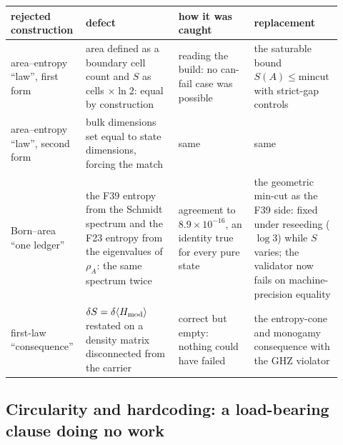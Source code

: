 \documentclass[11pt]{article}
\theoremstyle{definition}
\begin{document}
\begin{center}
\small
\begin{longtable}[]{@{}p{0.2\linewidth}p{0.27\linewidth}p{0.22\linewidth}p{0.23\linewidth}@{}}
\toprule
rejected construction & defect & how it was caught & replacement\\
\midrule
\endhead
area--entropy ``law'', first form & area defined as a boundary cell count and \(S\) as cells \(\times\ln2\): equal by
construction & reading the build: no can-fail case was possible & the saturable bound \(S(A)\le\mathrm{mincut}\) with
strict-gap controls\\
area--entropy ``law'', second form & bulk dimensions set equal to state dimensions, forcing the match & same & same\\
Born--area ``one ledger'' & the F39 entropy from the Schmidt spectrum and the F23 entropy from the eigenvalues of
\(\rho_A\): the same spectrum twice & agreement to \(8.9\times10^{-16}\), an identity true for every pure state & the
geometric min-cut as the F39 side: fixed under reseeding (\(\log3\)) while \(S\) varies; the validator now fails on
machine-precision equality\\
first-law ``consequence'' & \(\delta S=\delta\langle H_{\rm mod}\rangle\) restated on a density matrix disconnected
from the carrier & correct but empty: nothing could have failed & the entropy-cone and monogamy consequence with the
GHZ violator\\
\bottomrule
\end{longtable}
\end{center}

\subsection{Circularity and hardcoding: a load-bearing clause doing no work}\label{circularity-and-hardcoding-the-load-bearing-clause-doing-no-work}
\end{document}
